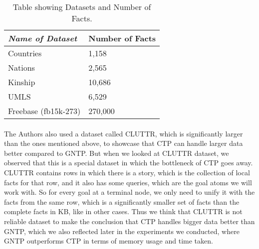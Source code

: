\documentclass[Other]{iitddiss}
\begin{document}
\begin{table}[H]
	\centering
	\begin{tabular}{|l|l|}
		\hline
		\textit{\textbf{Name of Dataset}} & \textbf{Number of Facts} \\ \hline
		Countries                               & 1,158                  \\ \hline
		Nations                        & 2,565                   \\ \hline
		Kinship                        & 10,686                   \\ \hline
		UMLS                       & 6,529                  \\ \hline
		Freebase	(fb15k-273)		& 270,000 		\\ \hline
	\end{tabular}
	\caption{Table showing Datasets and Number of Facts.}
\label{tab:my-table}
\end{table}

\paragraph{}
The Authors also used a dataset called CLUTTR, which is significantly larger than the ones mentioned above, to showcase that CTP can handle larger data better compared to GNTP. But when we looked at CLUTTR dataset, we observed that this is a special dataset in which the bottleneck of CTP goes away. CLUTTR contains rows in which there is a story, which is the collection of local facts for that row, and it also has some queries, which are the goal atoms we will work with. So for every goal at a terminal node, we only need to unify it with the facts from the same row, which is a significantly smaller set of facts than the complete facts in KB, like in other cases. Thus we think that CLUTTR is not reliable dataset to make the conclusion that CTP handles bigger data better than GNTP, which we also reflected later in the experiments we conducted, where GNTP outperforms CTP in terms of memory usage and time taken.
\end{document}
